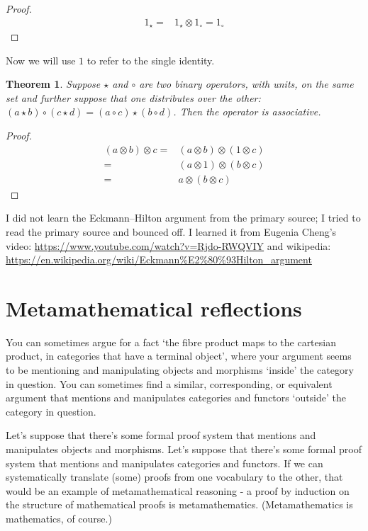 \documentclass[a4paper]{article}
\newtheorem{theorem}{Theorem}
\begin{document}
\begin{proof}
  \begin{align*}
      1_\star = & 1_\star \otimes 1_\circ = 1_\circ
  \end{align*}
\end{proof}

Now we will use \(1\) to refer to the single identity.

\begin{theorem}
Suppose \( \star \) and \( \circ \) are two binary operators, with units, on the 
same set and further suppose that one distributes over the other:
\( (a \star b) \circ (c \star d) = (a \circ c) \star (b \circ d) \).
Then the operator is associative. 
\end{theorem}

\begin{proof}
\begin{align*}
(a \otimes b) \otimes c = & (a \otimes b) \otimes (1 \otimes c) \\
= & (a \otimes 1) \otimes (b \otimes c) \\
= & a \otimes (b \otimes c)
\end{align*}
\end{proof}


I did not learn the Eckmann--Hilton argument from the primary source; I 
tried to read the primary source
and bounced 
off. I learned it from Eugenia Cheng's video:  
\url{https://www.youtube.com/watch?v=Rjdo-RWQVIY} and wikipedia: 
\url{https://en.wikipedia.org/wiki/Eckmann\%E2\%80\%93Hilton_argument}

\section{Metamathematical reflections}

You can sometimes argue for a fact `the fibre product maps to the cartesian product, in categories that have a terminal object', where your argument seems to be mentioning and manipulating objects and morphisms `inside' the category in question. You can sometimes find a similar, corresponding, or equivalent argument that mentions and manipulates categories and functors `outside' the category in question.

Let's suppose that there's some formal proof system that mentions and manipulates objects and morphisms.
Let's suppose that there's some formal proof system that mentions and manipulates categories and functors.
If we can systematically translate (some) proofs from one vocabulary to the other, that would be an example of metamathematical reasoning - a proof by induction on the structure of mathematical proofs is metamathematics.
(Metamathematics is mathematics, of course.)
\end{document}
